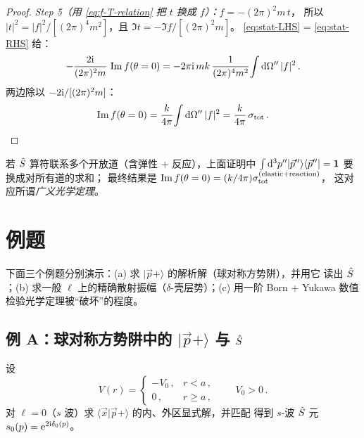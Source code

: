 \begin{proof}
\textit{Step 5（用 \eqref{eq:f-T-relation} 把 $t$ 换成 $f$）：}$f = -(2\pi)^2 m\,t$，
所以 $|t|^2 = |f|^2/[(2\pi)^4 m^2]$，且 $\Im t = -\Im f/[(2\pi)^2 m]$。
\eqref{eq:stat-LHS} = \eqref{eq:stat-RHS} 给：
\begin{equation}
  -\frac{2\mathrm{i}}{(2\pi)^2 m}\,\Im f(\theta=0)
  = -2\pi\mathrm{i}\,m k\,\frac{1}{(2\pi)^4 m^2}\!\int\mathrm{d}\Omega''\,|f|^2\,.
\end{equation}
两边除以 $-2\mathrm{i}/[(2\pi)^2 m]$：
\begin{equation}
  \Im f(\theta=0) = \frac{k}{4\pi}\!\int\mathrm{d}\Omega''\,|f|^2 = \frac{k}{4\pi}\,\sigma_{\rm tot}\,.
\end{equation}
\end{proof}

\begin{remark}[非弹性扩展]
若 $\hat{S}$ 算符联系多个开放道（含弹性 + 反应），上面证明中
$\int\mathrm{d}^3p''|\vec p''\rangle\langle\vec p''|=\mathbf{1}$ 要换成对所有道的求和；
最终结果是 $\Im f(\theta=0)=(k/4\pi)\sigma_{\rm tot}^{\rm (elastic+reaction)}$，
这对应所谓\emph{广义光学定理}。
\end{remark}

\section{例题}\label{sec:stat-examples}

下面三个例题分别演示：(a) 求 $|\vec p+\rangle$ 的解析解（球对称方势阱），并用它
读出 $\hat{S}$；(b) 求一般 $\ell$ 上的精确散射振幅（$\delta$-壳层势）；(c)
用一阶 Born + Yukawa 数值检验光学定理被``破坏''的程度。

\subsection{例 A：球对称方势阱中的 $|\vec p+\rangle$ 与 $\hat{S}$}
\label{sec:stat-ex-square}

\begin{example}\label{ex:square}
设
\begin{equation}
  V(r) = \begin{cases}-V_0\,, & r<a\,,\\ 0\,, & r\ge a\,,\end{cases}
  \qquad V_0>0\,.
  \label{eq:stat-square-V}
\end{equation}
对 $\ell=0$（$s$ 波）求 $\langle\vec x|\vec p+\rangle$ 的内、外区显式解，并匹配
得到 $s$-波 $\hat{S}$ 元 $s_0(p)=\mathrm{e}^{2\mathrm{i}\delta_0(p)}$。
\end{example}

